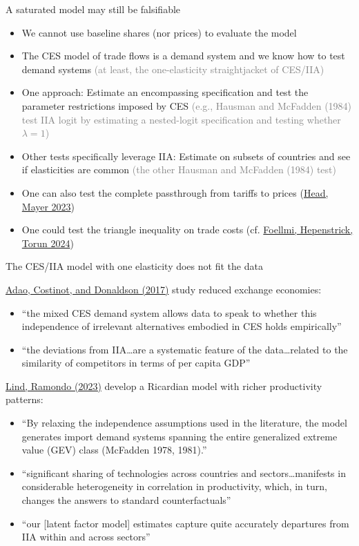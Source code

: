 \documentclass[11pt,notes=hide,aspectratio=169]{beamer}
\begin{document}
\begin{frame}{A saturated model may still be falsifiable}
\begin{itemize}
\item We cannot use baseline shares (nor prices) to evaluate the model
\item The CES model of trade flows is a demand system and we know how to test demand systems
\textcolor{gray}{(at least, the one-elasticity straightjacket of CES/IIA)}
\item One approach: Estimate an encompassing specification and test the parameter restrictions imposed by CES
\textcolor{gray}{(e.g., Hausman and McFadden (1984) test IIA logit by estimating a nested-logit specification and testing whether $\lambda = 1$)}
\item Other tests specifically leverage IIA:
Estimate on subsets of countries and see if elasticities are common
\textcolor{gray}{(the other Hausman and McFadden (1984) test)}
\item One can also test the complete passthrough from tariffs to prices (\href{https://direct.mit.edu/rest/article/doi/10.1162/rest_a_01369/117708/Poor-Substitutes-Counterfactual-Methods-in-IO-and}{Head, Mayer 2023})
\item One could test the triangle inequality on trade costs (cf. \href{https://doi.org/10.1016/j.jinteco.2024.104018}{Foellmi, Hepenstrick, Torun 2024})
\end{itemize}
\end{frame}
\begin{frame}{The CES/IIA model with one elasticity does not fit the data}
{\small
\href{https://www.aeaweb.org/articles?id=10.1257/aer.20150956}{Adao, Costinot, and Donaldson (2017)} study reduced exchange economies:
\begin{itemize}
\item ``the mixed CES demand system allows data to speak to whether this independence of irrelevant alternatives embodied in CES holds empirically''
\item ``the deviations from IIA\dots are a systematic feature of the data\dots related to the similarity of competitors in terms of per capita GDP''
\end{itemize}
\href{https://www.aeaweb.org/articles?id=10.1257/aer.20190781}{Lind, Ramondo (2023)} develop a Ricardian model with richer productivity patterns:
\begin{itemize}
\item ``By relaxing the independence assumptions used in the literature, the model generates import demand systems spanning the entire generalized extreme value (GEV) class (McFadden 1978, 1981).''
\item ``significant sharing of technologies across countries and sectors\dots manifests in considerable heterogeneity in correlation in productivity, which, in turn, changes the answers to standard counterfactuals''
\item ``our [latent factor model] estimates capture quite accurately departures from IIA within and across sectors''
\end{itemize}
}\end{frame}
\end{document}
